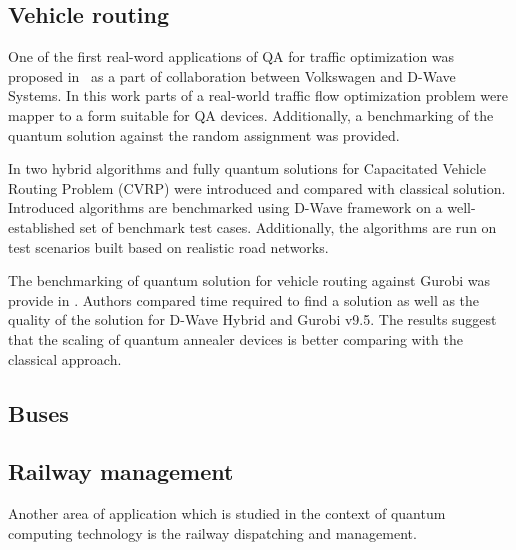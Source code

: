 \documentclass[a4paper,11pt]{article}
\begin{document}
\subsection{Vehicle routing}

One of the first real-word applications of QA for traffic optimization was proposed in~\cite{neukart2017traffic} as a part of collaboration between Volkswagen and D-Wave Systems. In this work parts of a real-world traffic flow optimization problem were mapper to a form suitable for QA devices. Additionally, a benchmarking of the quantum solution against the random assignment was provided.

In \cite{borowski2020new} two hybrid algorithms and fully quantum solutions for Capacitated Vehicle Routing Problem (CVRP) were introduced and compared with classical solution. Introduced algorithms are benchmarked using D-Wave framework on a well-established set of benchmark test cases. Additionally, the algorithms are run on test scenarios built based on realistic road networks.


The benchmarking of quantum solution for vehicle routing against Gurobi was provide in \cite{anil2022performance}. Authors compared time required to find a solution as well as the quality of the solution for D-Wave Hybrid and  Gurobi v9.5. The results suggest that the scaling of quantum annealer devices is better comparing with the classical approach.


\subsection{Buses}
 \cite{yarkoni2020quantum}

\subsection{Railway management}

Another area of application which is studied in the context of quantum computing technology is the railway dispatching and management.
\end{document}
